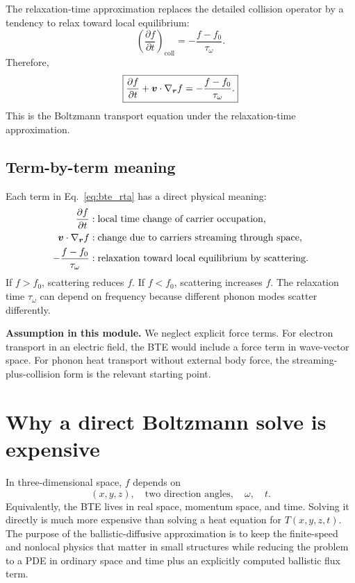 \documentclass[11pt]{article}
\begin{document}
The relaxation-time approximation replaces the detailed collision operator by a tendency to relax toward local equilibrium:
\begin{equation}
    \left(\frac{\partial f}{\partial t}\right)_{\mathrm{coll}}
    =-\frac{f-f_0}{\tau_\omega}.
\end{equation}
Therefore,
\begin{equation}
    \boxed{\frac{\partial f}{\partial t}+\bm{v}\cdot\nabla_{\bm{r}}f
    =-\frac{f-f_0}{\tau_\omega}.}
    \label{eq:bte_rta}
\end{equation}
This is the Boltzmann transport equation under the relaxation-time approximation.

\subsection{Term-by-term meaning}
Each term in Eq.~\eqref{eq:bte_rta} has a direct physical meaning:
\begin{align}
    \frac{\partial f}{\partial t} &: \text{local time change of carrier occupation,}\\
    \bm{v}\cdot\nabla_{\bm{r}}f &: \text{change due to carriers streaming through space,}\\
    -\frac{f-f_0}{\tau_\omega} &: \text{relaxation toward local equilibrium by scattering.}
\end{align}
If \(f>f_0\), scattering reduces \(f\). If \(f<f_0\), scattering increases \(f\). The relaxation time \(\tau_\omega\) can depend on frequency because different phonon modes scatter differently.

\begin{notebox}
\textbf{Assumption in this module.} We neglect explicit force terms. For electron transport in an electric field, the BTE would include a force term in wave-vector space. For phonon heat transport without external body force, the streaming-plus-collision form is the relevant starting point.
\end{notebox}

\section{Why a direct Boltzmann solve is expensive}
In three-dimensional space, \(f\) depends on
\begin{equation}
    (x,y,z),\quad \text{two direction angles},\quad \omega,\quad t.
\end{equation}
Equivalently, the BTE lives in real space, momentum space, and time. Solving it directly is much more expensive than solving a heat equation for \(T(x,y,z,t)\). The purpose of the ballistic-diffusive approximation is to keep the finite-speed and nonlocal physics that matter in small structures while reducing the problem to a PDE in ordinary space and time plus an explicitly computed ballistic flux term.
\end{document}

